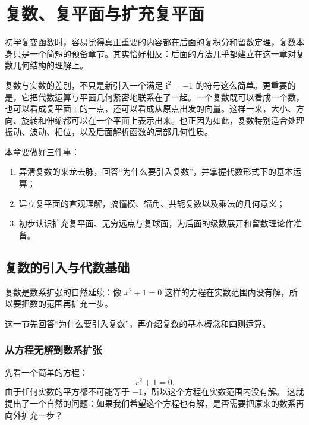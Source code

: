 
\chapter{复数、复平面与扩充复平面}

\begin{wulibj}[本章导读]
初学复变函数时，容易觉得真正重要的内容都在后面的复积分和留数定理，复数本身只是一个简短的预备章节。其实恰好相反：后面的方法几乎都建立在这一章对复数几何结构的理解上。

复数与实数的差别，不只是新引入一个满足 $\mathrm{i}^2=-1$ 的符号这么简单。更重要的是，它把代数运算与平面几何紧密地联系在了一起。一个复数既可以看成一个数，也可以看成复平面上的一点，还可以看成从原点出发的向量。这样一来，大小、方向、旋转和伸缩都可以在一个平面上表示出来。也正因为如此，复数特别适合处理振动、波动、相位，以及后面解析函数的局部几何性质。

本章要做好三件事：
\begin{enumerate}
    \item 弄清复数的来龙去脉，回答``为什么要引入复数''，并掌握代数形式下的基本运算；
    \item 建立复平面的直观理解，搞懂模、辐角、共轭复数以及乘法的几何意义；
    \item 初步认识扩充复平面、无穷远点与复球面，为后面的级数展开和留数理论作准备。
\end{enumerate}


\end{wulibj}

\newpage
\section{复数的引入与代数基础}

\begin{wulibj}[为什么要引入复数]
复数是数系扩张的自然延续：像 $x^2+1=0$ 这样的方程在实数范围内没有解，所以要把数的范围再扩充一步。

这一节先回答``为什么要引入复数''，再介绍复数的基本概念和四则运算。
\end{wulibj}

\subsection{从方程无解到数系扩张}
先看一个简单的方程：
\begin{equation}
	x^2 + 1 = 0.
\end{equation}
由于任何实数的平方都不可能等于 $-1$，所以这个方程在实数范围内没有解。
这就提出了一个自然的问题：如果我们希望这个方程也有解，是否需要把原来的数系再向外扩充一步？

